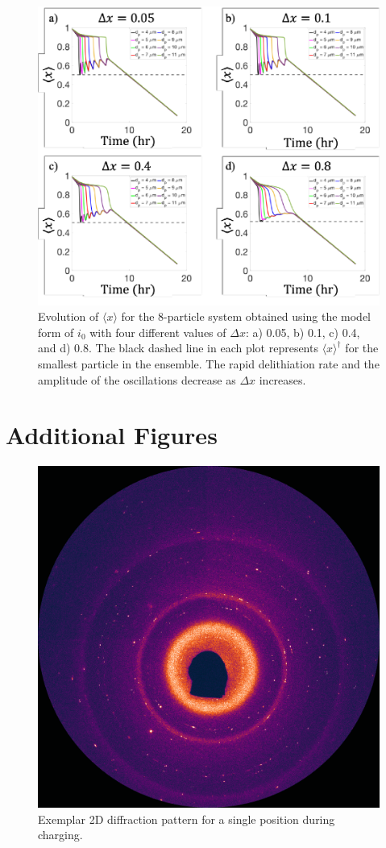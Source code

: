 \documentclass{article}
\begin{document}
\begin{figure}
  \includegraphics[width=\textwidth]{8-particle-evolution-deltax.pdf}
  \caption{Evolution of $\langle x\rangle$ for the
    8-particle system obtained using the model form of $i_0$ with
    four different values of $\Delta x$: a) 0.05, b) 0.1, c) 0.4, and d)
    0.8. The black dashed line in each plot represents
    $\langle x \rangle^\dag$ for the smallest particle in
    the ensemble. The rapid delithiation rate and the amplitude of
    the oscillations decrease as $\Delta x$ increases.}
  \label{fig:delta-x-sensitivity}
\end{figure}

\section{Additional Figures}

\begin{figure}
  \centering
  \includegraphics[width=0.5\linewidth]{figures/2D-diffraction.png}
  \caption{Exemplar 2D diffraction pattern for a single position
    during charging.}
  \label{fig:2Ddiffraction}
\end{figure}
\end{document}
